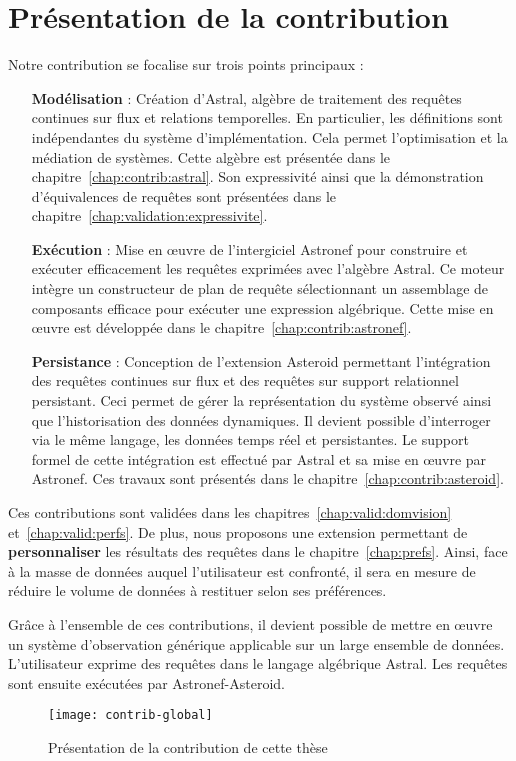 \chapter*{Présentation de la contribution}
Notre contribution se focalise sur trois points principaux :
\begin{itemize}
 \item[\textbf{Modélisation}] : Création d'Astral, algèbre de traitement des requêtes continues sur flux et relations temporelles. En particulier, les définitions sont indépendantes du système d'implémentation. Cela permet l'optimisation et la médiation de systèmes. Cette algèbre est présentée dans le chapitre~\ref{chap:contrib:astral}. Son expressivité ainsi que la démonstration d'équivalences de requêtes sont présentées dans le chapitre~\ref{chap:validation:expressivite}.
 \item[\textbf{Exécution}] : Mise en œuvre de l'intergiciel Astronef pour construire et exécuter efficacement les requêtes exprimées avec l'algèbre Astral. Ce moteur intègre un constructeur de plan de requête sélectionnant un assemblage de composants efficace pour exécuter une expression algébrique. Cette mise en œuvre est développée dans le chapitre~\ref{chap:contrib:astronef}.
 \item[\textbf{Persistance}] : Conception de l'extension Asteroid permettant l'intégration des requêtes continues sur flux et des requêtes sur support relationnel persistant. Ceci permet de gérer la représentation du système observé ainsi que l'historisation des données dynamiques. Il devient possible d'interroger via le même langage, les données temps réel et persistantes. Le support formel de cette intégration est effectué par Astral et sa mise en œuvre par Astronef. Ces travaux sont présentés dans le chapitre~\ref{chap:contrib:asteroid}.
\end{itemize}

Ces contributions sont validées dans les chapitres~\ref{chap:valid:domvision} et~\ref{chap:valid:perfs}. De plus, nous proposons une extension permettant de \textbf{personnaliser} les résultats des requêtes dans le chapitre~\ref{chap:prefs}. Ainsi, face à la masse de données auquel l'utilisateur est confronté, il sera en mesure de réduire le volume de données à restituer selon ses préférences.

Grâce à l'ensemble de ces contributions, il devient possible de mettre en œuvre un système d'observation générique applicable sur un large ensemble de données. L'utilisateur exprime des requêtes dans le langage algébrique Astral. Les requêtes sont ensuite exécutées par Astronef-Asteroid. 

\begin{figure}[ht]
	\centering
	\texttt{[image: contrib-global]}
	\caption{Présentation de la contribution de cette thèse}
\end{figure}
